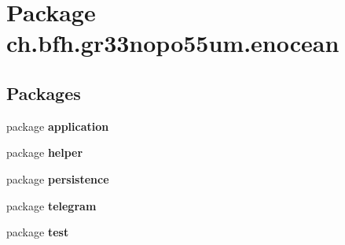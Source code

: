 \section{Package ch.\+bfh.\+gr33nopo55um.\+enocean}
\label{namespacech_1_1bfh_1_1gr33nopo55um_1_1enocean}
\subsection*{Packages}
\begin{DoxyCompactItemize}
\item 
package {\bf application}
\item 
package {\bf helper}
\item 
package {\bf persistence}
\item 
package {\bf telegram}
\item 
package {\bf test}
\end{DoxyCompactItemize}
